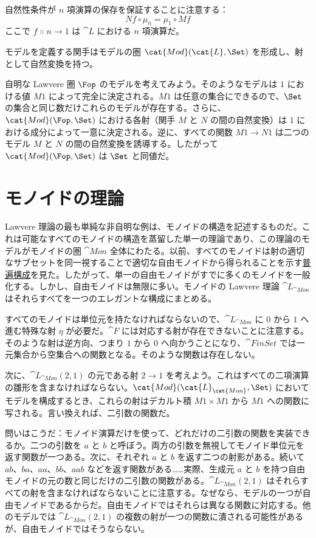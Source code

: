 自然性条件が $n$ 項演算の保存を保証することに注意する：
\[N f \circ \mu_n = \mu_1 \circ M f\]
ここで $f \Colon n \to 1$ は $\cat{L}$ における $n$ 項演算だ。

モデルを定義する関手はモデルの圏 $\cat{Mod}(\cat{L}, \Set)$ を形成し、射として自然変換を持つ。

自明な Lawvere 圏 $\Fop$ のモデルを考えてみよう。そのようなモデルは $1$ における値 $M 1$ によって完全に決定される。$M 1$ は任意の集合にできるので、$\Set$ の集合と同じ数だけこれらのモデルが存在する。さらに、$\cat{Mod}(\Fop, \Set)$ における各射（関手 $M$ と $N$ の間の自然変換）は $1$ における成分によって一意に決定される。逆に、すべての関数 $M 1 \to N 1$ は二つのモデル $M$ と $N$ の間の自然変換を誘導する。したがって $\cat{Mod}(\Fop, \Set)$ は $\Set$ と同値だ。

\section{モノイドの理論}

Lawvere 理論の最も単純な非自明な例は、モノイドの構造を記述するものだ。これは可能なすべてのモノイドの構造を蒸留した単一の理論であり、この理論のモデルがモノイドの圏 $\cat{Mon}$ 全体にわたる。以前、すべてのモノイドは射の適切なサブセットを同一視することで適切な自由モノイドから得られることを示す\hyperref[free-monoids]{普遍構成}を見た。したがって、単一の自由モノイドがすでに多くのモノイドを一般化する。しかし、自由モノイドは無限に多い。モノイドの Lawvere 理論 $\cat{L}_{\cat{Mon}}$ はそれらすべてを一つのエレガントな構成にまとめる。

すべてのモノイドは単位元を持たなければならないので、$\cat{L}_{\cat{Mon}}$ に $0$ から $1$ へ進む特殊な射 $\eta$ が必要だ。$\cat{F}$ には対応する射が存在できないことに注意する。そのような射は逆方向、つまり $1$ から $0$ へ向かうことになり、$\cat{FinSet}$ では一元集合から空集合への関数となる。そのような関数は存在しない。

次に、$\cat{L}_{\cat{Mon}}(2, 1)$ の元である射 $2 \to 1$ を考えよう。これはすべての二項演算の雛形を含まなければならない。$\cat{Mod}(\cat{L}_{\cat{Mon}}, \Set)$ においてモデルを構成するとき、これらの射はデカルト積 $M 1 \times M 1$ から $M 1$ への関数に写される。言い換えれば、二引数の関数だ。

問いはこうだ：モノイド演算だけを使って、どれだけの二引数の関数を実装できるか。二つの引数を $a$ と $b$ と呼ぼう。両方の引数を無視してモノイド単位元を返す関数が一つある。次に、それぞれ $a$ と $b$ を返す二つの射影がある。続いて $ab$、$ba$、$aa$、$bb$、$aab$ などを返す関数がある……実際、生成元 $a$ と $b$ を持つ自由モノイドの元の数と同じだけの二引数の関数がある。$\cat{L}_{\cat{Mon}}(2, 1)$ はそれらすべての射を含まなければならないことに注意する。なぜなら、モデルの一つが自由モノイドであるからだ。自由モノイドではそれらは異なる関数に対応する。他のモデルでは $\cat{L}_{\cat{Mon}}(2, 1)$ の複数の射が一つの関数に潰される可能性があるが、自由モノイドではそうならない。

